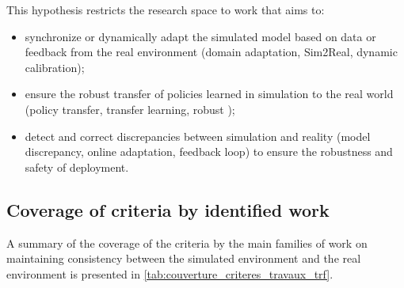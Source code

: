 This hypothesis restricts the research space to work that aims to:
\begin{itemize}
  \item synchronize or dynamically adapt the simulated model based on data or feedback from the real environment (domain adaptation, Sim2Real, dynamic calibration);
  \item ensure the robust transfer of policies learned in simulation to the real world (policy transfer, transfer learning, robust );
  \item detect and correct discrepancies between simulation and reality (model discrepancy, online adaptation, feedback loop) to ensure the robustness and safety of deployment.
\end{itemize}



\subsection*{Coverage of criteria by identified work}

A summary of the coverage of the criteria by the main families of work on maintaining consistency between the simulated environment and the real environment is presented in \autoref{tab:couverture_criteres_travaux_trf}.

